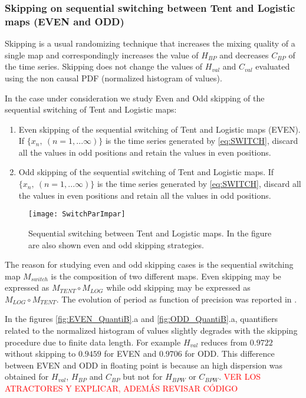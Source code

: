 \subsubsection{Skipping on sequential switching between Tent and Logistic maps (EVEN and ODD)} \label{sssec:skipp}

Skipping is a usual randomizing technique that increases the mixing quality of a single map and correspondingly increases the value of $H_{BP}$ and decreases $C_{BP} $ of the time series.
Skipping does not change the values of $H_{val}$ and $C_{val}$ evaluated using the non causal PDF (normalized histogram of values)\cite{DeMicco2008}.

In the case under consideration we study Even and Odd skipping of the sequential switching of Tent and Logistic maps:
\begin{enumerate}
	\item Even skipping of the sequential switching of Tent and Logistic maps (EVEN).\\
	If $\{x_n,~(n=1,...\infty)\}$ is the time series generated by \ref{eq:SWITCH}, discard all the values in odd positions and retain the values in even positions.
	\item Odd skipping of the sequential switching of Tent and Logistic maps.
	If $\{x_n,~(n=1,...\infty)\}$ is the time series generated by \ref{eq:SWITCH}, discard all the values in even positions and retain all the values in odd positions.
\end{enumerate}

\begin{figure}
	\texttt{[image: SwitchParImpar]}
	\caption{Sequential switching between Tent and Logistic maps. In the figure are also shown even and odd skipping strategies.} \label{fig:seq}
\end{figure}

The reason for studying even and odd skipping cases is the sequential switching map $M_{switch}$ is the composition of two different maps. Even skipping may be expressed as $M_{TENT}\circ M_{LOG}$ while odd skipping may be expressed as $M_{LOG} \circ M_{TENT}$.
The evolution of period as function of precision was reported in \cite{Nagaraj2008}.

In the figures \ref{fig:EVEN_QuantiB}.a and \ref{fig:ODD_QuantiB}.a, quantifiers related to the normalized histogram of values slightly degrades with the skipping procedure due to finite data length.
For example $H_{val}$ reduces from $0.9722$ without skipping to $0.9459$ for EVEN and $0.9706$ for ODD. 
This difference between EVEN and ODD in floating point is because an high dispersion was obtained for $H_{val}$, $H_{BP}$ and $C_{BP}$ but not for $H_{BPW}$ or $C_{BPW}$.
\textcolor{red}{VER LOS ATRACTORES Y EXPLICAR, ADEMÁS REVISAR CÓDIGO}


